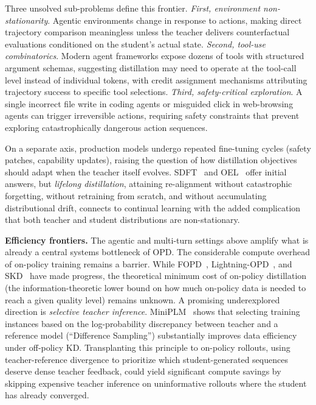 \documentclass{article} %
\begin{document}
Three unsolved sub-problems define this frontier. \emph{First, environment non-stationarity}. Agentic environments change in response to actions, making direct trajectory comparison meaningless unless the teacher delivers counterfactual evaluations conditioned on the student's actual state. \emph{Second, tool-use combinatorics}. Modern agent frameworks expose dozens of tools with structured argument schemas, suggesting distillation may need to operate at the tool-call level instead of individual tokens, with credit assignment mechanisms attributing trajectory success to specific tool selections. \emph{Third, safety-critical exploration}. A single incorrect file write in coding agents or misguided click in web-browsing agents can trigger irreversible actions, requiring safety constraints that prevent exploring catastrophically dangerous action sequences.

On a separate axis, production models undergo repeated fine-tuning cycles (safety patches, capability updates), raising the question of how distillation objectives should adapt when the teacher itself evolves. SDFT~\citep{2601.19897} and OEL~\citep{2603.16856} offer initial answers, but \emph{lifelong distillation}, attaining re-alignment without catastrophic forgetting, without retraining from scratch, and without accumulating distributional drift, connects to continual learning with the added complication that both teacher and student distributions are non-stationary.

\textbf{Efficiency frontiers.} The agentic and multi-turn settings above amplify what is already a central systems bottleneck of OPD. The considerable compute overhead of on-policy training remains a barrier. While FOPD~\citep{2602.15260}, Lightning-OPD~\citep{2604.13010}, and SKD~\citep{2410.11325} have made progress, the theoretical minimum cost of on-policy distillation (the information-theoretic lower bound on how much on-policy data is needed to reach a given quality level) remains unknown. A promising underexplored direction is \emph{selective teacher inference}. MiniPLM~\citep{2410.17215} shows that selecting training instances based on the log-probability discrepancy between teacher and a reference model (``Difference Sampling'') substantially improves data efficiency under off-policy KD. Transplanting this principle to on-policy rollouts, using teacher-reference divergence to prioritize which student-generated sequences deserve dense teacher feedback, could yield significant compute savings by skipping expensive teacher inference on uninformative rollouts where the student has already converged.
\end{document}
